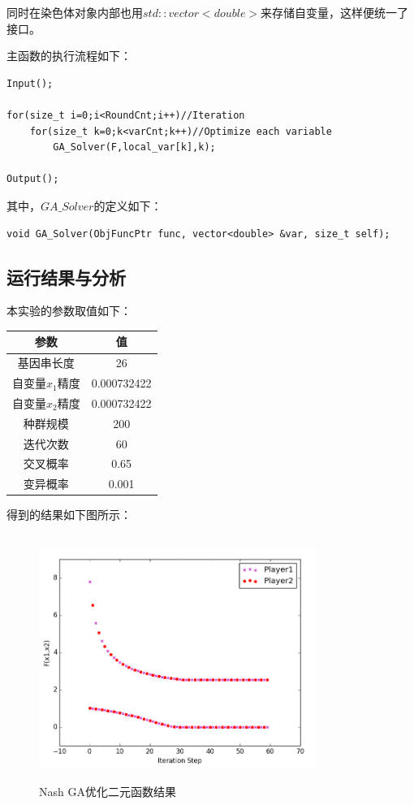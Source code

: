 \documentclass[UTF8]{ctexart}
\begin{document}
\indent 同时在染色体对象内部也用$std::vector<double>$来存储自变量，这样便统一了接口。
\clearpage

\indent 主函数的执行流程如下：
\begin{lstlisting}
Input();

for(size_t i=0;i<RoundCnt;i++)//Iteration
	for(size_t k=0;k<varCnt;k++)//Optimize each variable
		GA_Solver(F,local_var[k],k);

Output();
\end{lstlisting}

\indent 其中，$GA\_Solver$的定义如下：
\begin{lstlisting}
void GA_Solver(ObjFuncPtr func, vector<double> &var, size_t self);
\end{lstlisting}

\subsection{运行结果与分析}
\indent 本实验的参数取值如下：
\begin{table}[htbp]\centering
\begin{tabular}{cc}
  \toprule
  参数 & 值 \\
  \midrule
  基因串长度 & 26 \\
  自变量$x_1$精度 & 0.000732422\\
  自变量$x_2$精度 & 0.000732422\\
  种群规模   & 200 \\
  迭代次数   & 60 \\
  交叉概率   & 0.65 \\
  变异概率   & 0.001 \\
  \bottomrule
\end{tabular}
\end{table}

\indent 得到的结果如下图所示：
\begin{figure}[htbp]\centering
\includegraphics[width=9cm,height=8cm]{../pic/T2_res_f.png}
\caption{Nash GA优化二元函数结果}
\end{figure}
\end{document}
